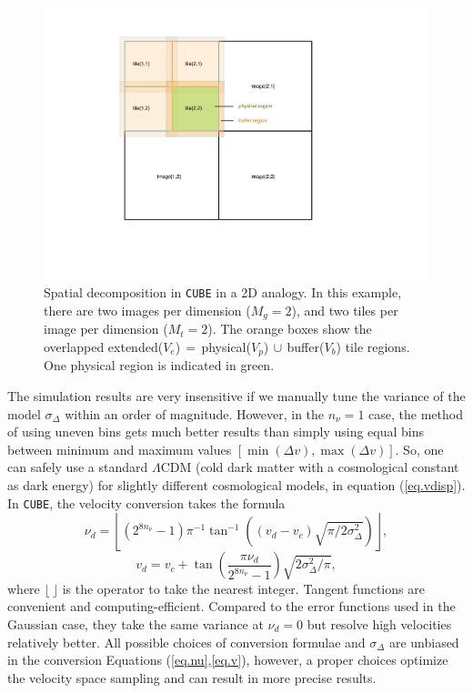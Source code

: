 \documentclass[10pt,twocolumn,preprint]{emulateapj}
\begin{document}
\begin{figure}
\centering
  \includegraphics[width=0.9\linewidth]{f2}
 \caption{Spatial decomposition in {\tt CUBE} in a 2D analogy. In this example, there are two images per dimension ($M_g=2$), and two tiles per image per dimension ($M_t=2$). The orange boxes show the overlapped extended($V_e$)$\,=\,$physical($V_p$)$\,\cup\,$buffer($V_b$) tile regions. One physical region is indicated in green.}
\label{fig.tile}
\end{figure}

The simulation results are very insensitive if we manually tune the variance of the model $\sigma_\Delta$ within an order of magnitude. However, in the $n_\nu=1$ case, the method of using uneven bins gets much better results than simply using equal bins between minimum and maximum values $[\min(\Delta v),\max(\Delta v)]$. So, one can safely use a standard $\Lambda$CDM (cold dark matter with a cosmological constant as dark energy) for slightly different cosmological models, in equation (\ref{eq.vdisp}). In {\tt CUBE}, the velocity conversion takes the formula
\begin{equation}\label{eq.nu}
	\nu_d=\left\lfloor(2^{8n_\nu}-1)\pi^{-1}\tan^{-1}\left((v_d-v_c)\sqrt{\pi/2\sigma_\Delta^2}\right)\right\rfloor,
\end{equation}
\begin{equation}\label{eq.v}
	v_d=v_c+\tan\left(\frac{\pi\nu_d}{2^{8n_\nu}-1}\right)\sqrt{2\sigma_\Delta^2/\pi},
\end{equation}
where $\lfloor\ \rfloor$ is the operator to take the nearest integer. Tangent functions are convenient and computing-efficient. Compared to the error functions used in the Gaussian case, they take the same variance at $\nu_d=0$ but resolve high velocities relatively better.  All possible choices of conversion formulae and $\sigma_\Delta$ are unbiased in the conversion Equations (\ref{eq.nu},\ref{eq.v}), however, a proper choices optimize the velocity space sampling and can result in more precise results.
\end{document}
